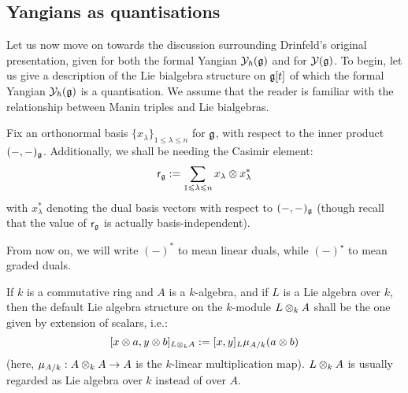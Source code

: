     \subsection{Yangians as quantisations}
        Let us now move on towards the discussion surrounding Drinfeld's original presentation, given for both the formal Yangian $\mathcal{Y}_{\hbar}(\mathfrak{g})$ and for $\mathcal{Y}(\mathfrak{g})$. To begin, let us give a description of the Lie bialgebra structure on $\mathfrak{g}[t]$ of which the formal Yangian $\mathcal{Y}_{\hbar}(\mathfrak{g})$ is a quantisation. We assume that the reader is familiar with the relationship between Manin triples and Lie bialgebras.

        \begin{convention}
            Fix an orthonormal basis $\{x_{\lambda}\}_{1 \leq \lambda \leq n}$ for $\mathfrak{g}$, with respect to the inner product $(-, -)_{\mathfrak{g}}$. Additionally, we shall be needing the Casimir element:
                $$\sfr_{\g} := \sum_{1 \leq \lambda \leq n} x_{\lambda} \tensor x_{\lambda}^*$$
            with $x_{\lambda}^*$ denoting the dual basis vectors with respect to $(-, -)_{\mathfrak{g}}$ (though recall that the value of $\mathsf{r}_{\mathfrak{g}}$ is actually basis-independent).
        \end{convention}
        \begin{convention}
            From now on, we will write $(-)^*$ to mean linear duals, while $(-)^{\star}$ to mean graded duals. 
        \end{convention}
        \begin{convention}
            If $k$ is a commutative ring and $A$ is a $k$-algebra, and if $L$ is a Lie algebra over $k$, then the default Lie algebra structure on the $k$-module $L \tensor_k A$ shall be the one given by extension of scalars, i.e.:
                $$[x \tensor a, y \tensor b]_{L \tensor_k A} := [x, y]_L \mu_{A/k}(a \tensor b)$$
            (here, $\mu_{A/k}: A \tensor_k A \to A$ is the $k$-linear multiplication map). $L \tensor_k A$ is usually regarded as Lie algebra over $k$ instead of over $A$.  
        \end{convention}
        
